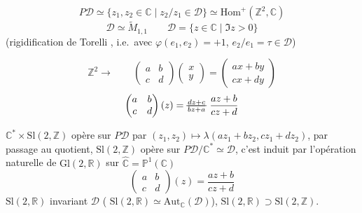 \documentclass[11pt,a4paper]{article}
\begin{document}


\[
  P\mathcal{D} \simeq \{z_{1}, z_{2} \in \mathbb{C} \mid z_{2}/z_{1} \in \mathcal{D}\} \simeq \mathrm{Hom}^{+}(\mathbb{Z}^{2}, \mathbb{C})
\]
\[
  \mathcal{D} \simeq \widetilde{M}_{1,1} \qquad \mathcal{D} = \{z \in \mathbb{C} \mid \Im z > 0\}
\]
(rigidification de Torelli , i.e.\ avec $\varphi(e_{1}, e_{2}) = +1$, $e_{2}/e_{1} = \tau \in \mathcal{D}$)


\[
  \mathbb{Z}^{2} \to \qquad
  \begin{pmatrix} a & b \\ c & d \end{pmatrix} \begin{pmatrix} x \\ y \end{pmatrix} = \begin{pmatrix} ax + by \\ cx + dy \end{pmatrix}
\]
\[
  \begin{pmatrix} a & b \\ c & d \end{pmatrix}(z) = \text{\struck{$\frac{dz + c}{bz + a}$}}\ \frac{az + b}{cz + d}
\]

$\mathbb{C}^{*} \times \mathrm{Sl}(2, \mathbb{Z})$ opère sur $P\mathcal{D}$ par $(z_{1}, z_{2}) \mapsto \lambda(az_{1} + bz_{2}, cz_{1} + dz_{2})$, \ill{} par passage au quotient, $\mathrm{Sl}(2, \mathbb{Z})$ opère sur $P\mathcal{D}/\mathbb{C}^{*} \simeq \mathcal{D}$, c'est induit par l'opération naturelle de $\mathrm{Gl}(2, \mathbb{R})$ sur $\hat{\mathbb{C}} = \mathbb{P}^{1}(\mathbb{C})$
\[
  \begin{pmatrix} a & b \\ c & d \end{pmatrix}(z) = \frac{az + b}{cz + d}
\]
$\mathrm{Sl}(2, \mathbb{R})$ invariant $\mathcal{D}$ ( $\mathrm{Sl}(2, \mathbb{R}) \simeq \mathrm{Aut}_{\mathbb{C}}(\mathcal{D})$), $\mathrm{Sl}(2, \mathbb{R}) \supset \mathrm{Sl}(2, \mathbb{Z})$.
\end{document}

